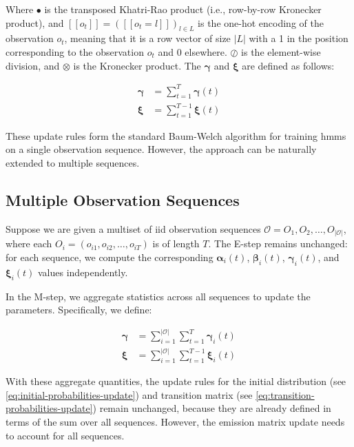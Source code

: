 Where $\bullet$ is the transposed Khatri-Rao product (i.e., row-by-row Kronecker product), and $[[o_t]] = ([[o_t=l]])_{l \in L}$ is the one-hot encoding of the observation $o_t$, meaning that it is a row vector of size $|L|$ with a 1 in the position corresponding to the observation $o_t$ and 0 elsewhere.
$\oslash$ is the element-wise division, and $\otimes$ is the Kronecker product.
The $\pmb{\gamma}$ and $\pmb{\xi}$ are defined as follows:


\begin{align}
    \pmb{\gamma} & = \sum_{t=1}^{T} \pmb{\gamma}(t) \\
    \pmb{\xi}    & = \sum_{t=1}^{T-1} \pmb{\xi}(t)
    \label{eq:gamma-xi-definitions}
\end{align}


These update rules form the standard Baum-Welch algorithm for training \glspl{hmm} on a single observation sequence.
However, the approach can be naturally extended to multiple sequences.


\subsection{Multiple Observation Sequences}\label{subsec:multiple-observation-sequences}
Suppose we are given a multiset of \gls{iid} observation sequences $\mathcal{O} = {O_1, O_2, \ldots, O_{|\mathcal{O}|}}$, where each $O_i = (o_{i1}, o_{i2}, \ldots, o_{iT})$ is of length $T$.
The E-step remains unchanged: for each sequence, we compute the corresponding $\pmb{\alpha}_i(t)$, $\pmb{\beta}_i(t)$, $\pmb{\gamma}_i(t)$, and $\pmb{\xi}_i(t)$ values independently.

In the M-step, we aggregate statistics across all sequences to update the parameters.
Specifically, we define:

\begin{align}
    \pmb{\gamma} & = \sum_{i=1}^{|\mathcal{O}|}\sum_{t=1}^{T} \pmb{\gamma}_{i}(t) \\
    \pmb{\xi}    & = \sum_{i=1}^{|\mathcal{O}|}\sum_{t=1}^{T-1} \pmb{\xi}_{i}(t)
\end{align}

With these aggregate quantities, the update rules for the initial distribution (see \autoref{eq:initial-probabilities-update}) and transition matrix (see \autoref{eq:transition-probabilities-update}) remain unchanged, because they are already defined in terms of the sum over all sequences.
However, the emission matrix update needs to account for all sequences.


